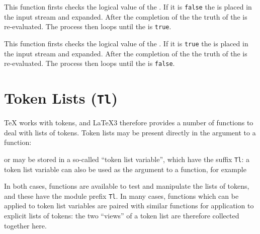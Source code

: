 \documentclass[oneside]{book}
\begin{document}
\begin{function}{\boolVarUntilDo}
\begin{syntax}
  
\end{syntax}
This function firsts checks the logical value of the .
If it is \texttt{false} the  is placed in the input stream
and expanded. After the completion of the  the truth
of the  is re-evaluated. The process then loops
until the  is \texttt{true}.
\begin{demohigh}
\IgnoreSpacesOn
\boolSetFalse \lTmpaBool
\intZero \lTmpaInt
\clistClear \lTmpaClist
\boolVarUntilDo {}
\clistVarJoin \lTmpaClist {:}
\IgnoreSpacesOff
\end{demohigh}
\end{function}

\begin{function}{\boolVarWhileDo}
\begin{syntax}
  
\end{syntax}
This function firsts checks the logical value of the .
If it is \texttt{true} the  is placed in the input stream
and expanded. After the completion of the  the truth
of the  is re-evaluated. The process then loops
until the  is \texttt{false}.
\begin{demohigh}
\IgnoreSpacesOn
\boolSetTrue \lTmpaBool
\intZero \lTmpaInt
\clistClear \lTmpaClist
\boolVarWhileDo {}
\clistVarJoin \lTmpaClist {:}
\IgnoreSpacesOff
\end{demohigh}
\end{function}

\chapter{Token Lists (\texttt{Tl})}

\TeX{} works with tokens, and \LaTeX3 therefore provides a number of
functions to deal with lists of tokens.  Token lists may be present
directly in the argument to a function:
\begin{codehigh}
\end{codehigh}
or may be stored in a so-called \enquote{token list variable}, which
have the suffix \texttt{Tl}: a token list variable can also be used as
the argument to a function, for example
\begin{codehigh}
\tlVarFoo \lSomeTl
\end{codehigh}
In both cases, functions are available to test and manipulate the lists
of tokens, and these have the module prefix \texttt{Tl}.
In many cases, functions which can be applied to token list variables
are paired with similar functions for application to explicit lists
of tokens: the two \enquote{views} of a token list are therefore collected
together here.
\end{document}
